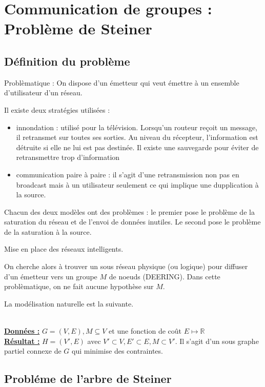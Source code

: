 \documentclass[a4paper,11pt]{thesis}
\begin{document}
\chapter{Communication de groupes : Problème de Steiner}

\section{D\'{e}finition du probl\`{e}me}

Problèmatique : On dispose d'un émetteur qui veut émettre à un ensemble d'utilisateur d'un réseau.

Il existe deux stratégies utilisées :
\begin{itemize}
    \item innondation : utilisé pour la télévision. Lorsqu'un routeur reçoit un message, il
        retransmet sur toutes ses sorties. Au niveau du récepteur, l'information est détruite si
        elle ne lui est pas destinée. Il existe une sauvegarde pour éviter de retransmettre trop
        d'information
    \item communication paire à paire : il s'agit d'une retransmission non pas en broadcast mais
        à un utilisateur seulement ce qui implique une dupplication à la source.
\end{itemize}

Chacun des deux modèles ont des problèmes : le premier pose le problème de la saturation du réseau
et de l'envoi de données inutiles. Le second pose le problème de la saturation à la source.

Mise en place des réseaux intelligents.

On cherche alors à trouver un sous réseau physique (ou logique) pour diffuser d'un émetteur vers un
groupe $M$ de noeuds (DEERING). Dans cette problèmatique, on ne fait aucune hypothèse sur $M$.

La modélisation naturelle est la suivante.

\begin{df}
    ~\\
    \textbf{\underline{Données :}} $G = (V, E), M \subseteq V$ et une fonction de coût $E \mapsto
    \mathbb{R}$\\
    \textbf{\underline{Résultat :}} $H = (V', E)$ avec $V' \subset V, E' \subset E, M \subset V'$.
    Il s'agit d'un sous graphe partiel connexe de $G$ qui minimise des contraintes.
\end{df}

\section{Probl\'{e}me de l'arbre de Steiner}
\end{document}
